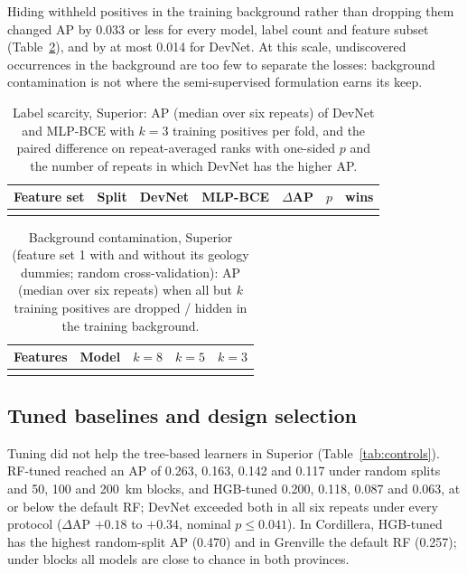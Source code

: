 \documentclass[pdflatex,sn-apa]{sn-jnl}
\begin{document}
Hiding withheld positives in the training background rather than dropping them changed AP by 0.033 or less for every model, label count and feature subset (Table~\ref{tab:contamination}), and by at most 0.014 for DevNet. At this scale, undiscovered occurrences in the background are too few to separate the losses: background contamination is not where the semi-supervised formulation earns its keep.

\begin{table}[t]
\caption{Label scarcity, Superior: AP (median over six repeats) of DevNet and MLP-BCE with $k = 3$ training positives per fold, and the paired difference on repeat-averaged ranks with one-sided $p$ and the number of repeats in which DevNet has the higher AP.}\label{tab:scarcity}
\footnotesize
\setlength{\tabcolsep}{3pt}
\begin{tabular*}{\textwidth}{@{\extracolsep\fill}llccccc}
\toprule
Feature set & Split & DevNet & MLP-BCE & $\Delta$AP & $p$ & wins \\
\midrule
\botrule
\end{tabular*}
\end{table}

\begin{table}[t]
\caption{Background contamination, Superior (feature set 1 with and without its geology dummies; random cross-validation): AP (median over six repeats) when all but $k$ training positives are dropped / hidden in the training background.}\label{tab:contamination}
\footnotesize
\begin{tabular*}{\textwidth}{@{\extracolsep\fill}llccc}
\toprule
Features & Model & $k = 8$ & $k = 5$ & $k = 3$ \\
\midrule
\botrule
\end{tabular*}
\end{table}

\subsection{Tuned baselines and design selection}\label{sec:res-controls}

Tuning did not help the tree-based learners in Superior (Table~\ref{tab:controls}). RF-tuned reached an AP of 0.263, 0.163, 0.142 and 0.117 under random splits and 50, 100 and 200~km blocks, and HGB-tuned 0.200, 0.118, 0.087 and 0.063, at or below the default RF; DevNet exceeded both in all six repeats under every protocol ($\Delta$AP $+0.18$ to $+0.34$, nominal $p \leq 0.041$). In Cordillera, HGB-tuned has the highest random-split AP (0.470) and in Grenville the default RF (0.257); under blocks all models are close to chance in both provinces.
\end{document}
